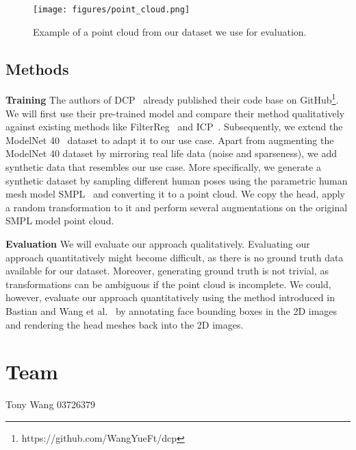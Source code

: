 \documentclass[a4paper,pagesize 10pt]{scrartcl}
\begin{document}
\begin{figure}[!ht]
    \centering
    \texttt{[image: figures/point\_cloud.png]}
    \caption{Example of a point cloud from our dataset we use for evaluation.}
    \label{fig:example_pcd}
\end{figure}

\subsection{Methods}

\textbf{Training} The authors of DCP~\cite{dcp} already published their code base on GitHub\footnote{https://github.com/WangYueFt/dcp}.
We will first use their pre-trained model and compare their method qualitatively against existing methods like FilterReg~\cite{filterreg} and ICP~\cite{icp}.
Subsequently, we extend the ModelNet 40~\cite{modelnet40} dataset to adapt it to our use case.
Apart from augmenting the ModelNet 40 dataset by mirroring real life data (noise and sparseness), we add synthetic data that resembles our use case.
More specifically, we generate a synthetic dataset by sampling different human poses using the parametric human mesh model SMPL~\cite{SMPL:2015} and converting it to a point cloud. 
We copy the head, apply a random transformation to it and perform several augmentations on the original SMPL model point cloud.

\noindent\textbf{Evaluation}
We will evaluate our approach qualitatively.
Evaluating our approach quantitatively might become difficult, as there is no ground truth data available for our dataset.
Moreover, generating ground truth is not trivial, as transformations can be ambiguous if the point cloud is incomplete.
We could, however, evaluate our approach quantitatively using the method introduced in Bastian and Wang et al.~\cite{disguisor} by annotating face bounding boxes in the 2D images and rendering the head meshes back into the 2D images.


\section{Team}
Tony Wang 03726379

{\small
	
	
}
\end{document}
